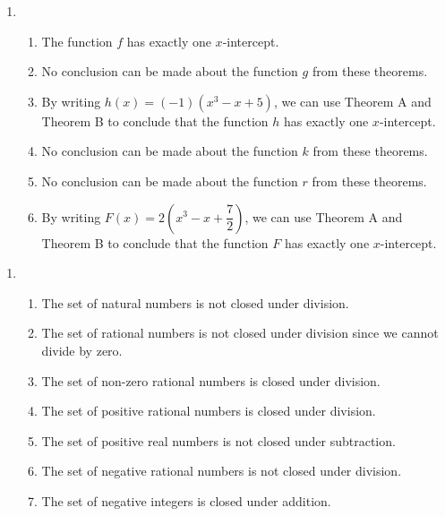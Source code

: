 \begin{enumerate}
\item \begin{enumerate} 
\item The function $f$ has exactly one $x$-intercept.

\item No conclusion can be made about the function $g$ from these theorems.

\item By writing $h(x) = (-1)\left(x^3 - x + 5 \right)$, we can use Theorem A and Theorem B to conclude that the function $h$ has exactly one $x$-intercept.

\item No conclusion can be made about the function $k$ from these theorems.

\item No conclusion can be made about the function $r$ from these theorems.

\item By writing $F(x) = 2 \left(x^3 - x + \dfrac{7}{2} \right)$, we can use Theorem A and Theorem B to conclude that the function $F$ has exactly one $x$-intercept.
\end{enumerate}
\end{enumerate}




\begin{enumerate}
\item \begin{enumerate} 
\item The set of natural numbers is not closed under division.

\item The set of rational numbers is not closed under division since we cannot divide by zero.

\item The set of non-zero rational numbers is closed under division.

\item The set of positive rational numbers is closed under division.

\item The set of positive real numbers is not closed under subtraction.

\item The set of negative rational numbers is not closed under division.

\item The set of negative integers is closed under addition.
\end{enumerate}
\end{enumerate}




\hbreak
\endinput
